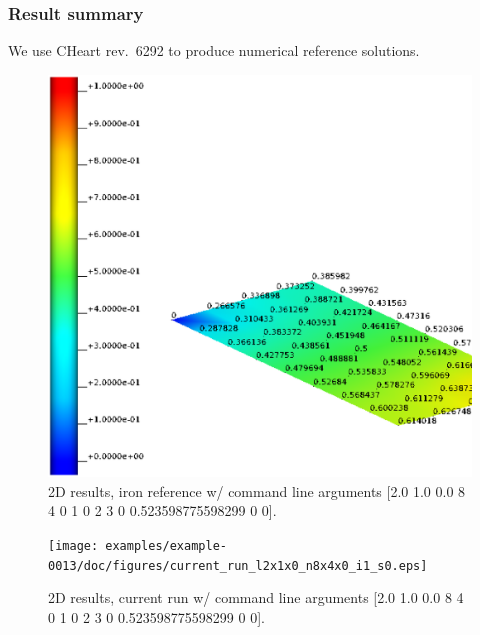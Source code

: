 \subsubsection{Result summary}
%
We use CHeart rev.\ 6292 to produce numerical reference solutions.
%


%
\begin{figure}[h!]
    \centering 
    \includegraphics[width=0.9\columnwidth]{examples/example-0013/doc/figures/iron_reference_2D.eps} 
    \caption{2D results, iron reference w/ command line arguments [2.0 1.0 0.0 8 4 0 1 0 2 3 0 0.523598775598299 0 0].}
    \label{example-0013-iron-2D-reference-fig}
\end{figure}
%
\begin{figure}[h!]
    \centering 
    \texttt{[image: examples/example-0013/doc/figures/current\_run\_l2x1x0\_n8x4x0\_i1\_s0.eps]} 
    \caption{2D results, current run w/ command line arguments [2.0 1.0 0.0 8 4 0 1 0 2 3 0 0.523598775598299 0 0].}
    \label{example-0013-current-run-2D-fig}
\end{figure}
%

